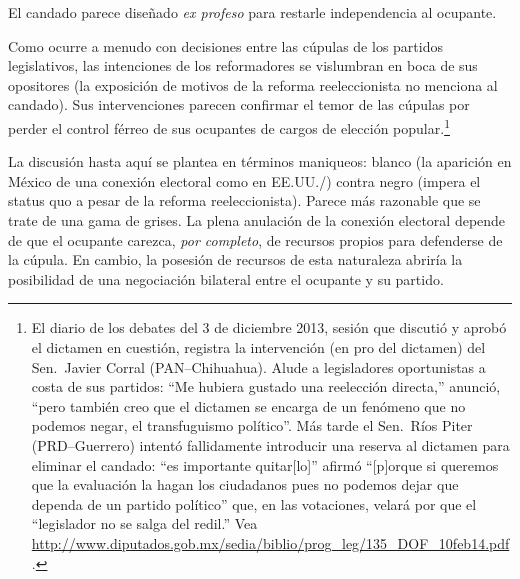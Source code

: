 \documentclass[letter,12pt]{article}
\begin{document}
El candado parece diseñado \emph{ex profeso} para restarle independencia al ocupante. 

Como ocurre a menudo con decisiones entre las cúpulas de los partidos legislativos, las intenciones de los reformadores se vislumbran en boca de sus opositores (la exposición de motivos de la reforma reeleccionista no menciona al candado). Sus intervenciones parecen confirmar el temor de las cúpulas por perder el control férreo de sus ocupantes de cargos de elección popular.\footnote{El diario de los debates del 3 de diciembre 2013, sesión que discutió y aprobó el dictamen en cuestión, registra la intervención (en pro del dictamen) del Sen.\ Javier Corral (PAN--Chihuahua). Alude a legisladores oportunistas a costa de sus partidos: ``Me hubiera gustado una reelección directa,'' anunció, ``pero también creo que el dictamen se encarga de un fenómeno que no podemos negar, el transfuguismo político''. Más tarde el Sen.\ Ríos Piter (PRD--Guerrero) intentó fallidamente introducir una reserva al dictamen para eliminar el candado: ``es importante quitar[lo]'' afirmó ``[p]orque si queremos que la evaluación la hagan los ciudadanos pues no podemos dejar que dependa de un partido político'' que, en las votaciones, velará por que el ``legislador no se salga del redil.'' Vea \url{http://www.diputados.gob.mx/sedia/biblio/prog_leg/135_DOF_10feb14.pdf}.}



La discusión hasta aquí se plantea en términos maniqueos: blanco (la aparición en México de una conexión electoral como en EE.UU./) contra negro (impera el status quo a pesar de la reforma reeleccionista). Parece más razonable que se trate de una gama de grises. La plena anulación de la conexión electoral depende de que el ocupante carezca, \emph{por completo}, de recursos propios para defenderse de la cúpula. En cambio, la posesión de recursos de esta naturaleza abriría la posibilidad de una negociación bilateral entre el ocupante y su partido. 
\end{document}
